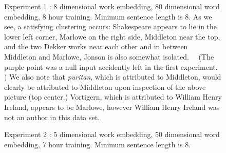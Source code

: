 \documentclass{article}%
\begin{document}
\begin{figure}
\noindent{}
\caption{Experiment 1 : 8 dimensional work embedding, 80 dimensional word embedding,  8 hour training.  Minimum sentence length is 8.
As we see, a satisfying clustering occurs: Shakespeare appears to lie in the
lower left corner, Marlowe on the right side, Middleton near the top, and the
two Dekker works near each other and in between Middleton and Marlowe, Jonson
is also somewhat isolated. \ \ (The purple point was a null input accidently
left in the first experiment. ) We also note that \textit{puritan}, which is attributed to Middleton, would
clearly be attributed to Middleton upon inspection of the above picture (top center.) Vortigern, which is attributed to William Henry Ireland, appears to be
Marlowe, however William Henry Ireland was not an author in this data set.
 }
\end{figure}


\begin{figure}
\noindent{}
\caption{Experiment 2 : 5 dimensional work embedding, 50 dimensional word embedding, 7 hour training. Minimum sentence length is 8.}
\end{figure}
\end{document}
